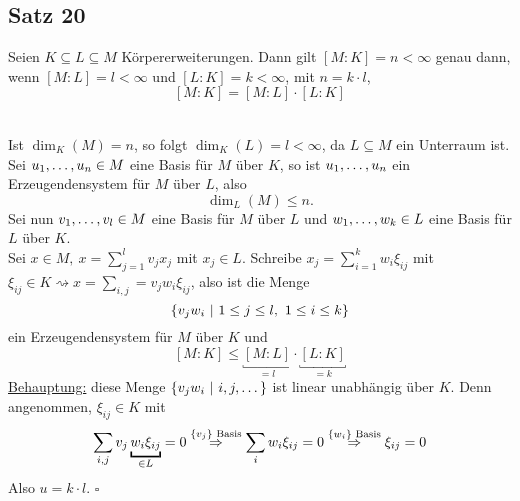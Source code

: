 \subsection{Satz 20}
\label{sub:satz_20}
Seien $K\subseteq L\subseteq M$ Körpererweiterungen.
Dann gilt $[M:K]=n<\infty$ genau dann, wenn $[M:L]=l<\infty$ und $[L:K]=k<\infty$, mit $n=k\cdot l$,
\[
[M:K]=[M:L]\cdot [L:K]
\]

\\
Ist $\dim_K(M)=n$, so folgt $\dim_K(L)=l<\infty$, da $L\subseteq M$ ein Unterraum ist.
Sei $u_1, \dots ,u_n\in M$ eine Basis für $M$ über $K$, so ist $u_1, \dots ,u_n$ ein Erzeugendensystem für $M$ über $L$, also
\[
\dim_L(M)\le n.
\]
Sei nun $v_1, \dots ,v_l\in M$ eine Basis für $M$ über $L$ und $w_1, \dots ,w_k\in L$ eine Basis für $L$ über $K$.\\
Sei $x\in M,~x=\sum_{j=1}^{l}v_jx_j$ mit $x_j\in L$.
Schreibe $x_j=\sum_{i=1}^k
w_i\xi_{ij}$ mit $\xi_{ij}\in K\rightsquigarrow x=\sum_{i,j}=v_jw_i\xi_{ij}$, also ist die Menge 
\[
\left\{v_jw_i~|~1\le j\le l,~1\le i\le k\right\}
\]
ein Erzeugendensystem für $M$ über $K$ und
\[
[M:K]\le \underbracket{[M:L]}_{=l}\cdot \underbracket{[L:K]}_{=k}
\]
\uline{Behauptung:} diese Menge $\left\{v_jw_i~|~i,j,\dots\right\}$ ist linear unabhängig über $K$.
Denn angenommen, $\xi_{ij}\in K$ mit
\[
\sum_{i,j}v_j\underbracket{w_i\xi_{ij}}_{\in L}=0\stackrel{\penbrace{v_j}\text{ Basis}}{\Rightarrow} \sum_i w_i\xi_{ij}=0\stackrel{\penbrace{w_i}\text{ Basis}}{\Rightarrow} \xi_{ij}=0
\]
Also $u=k\cdot l$.
\hfill $\square$

